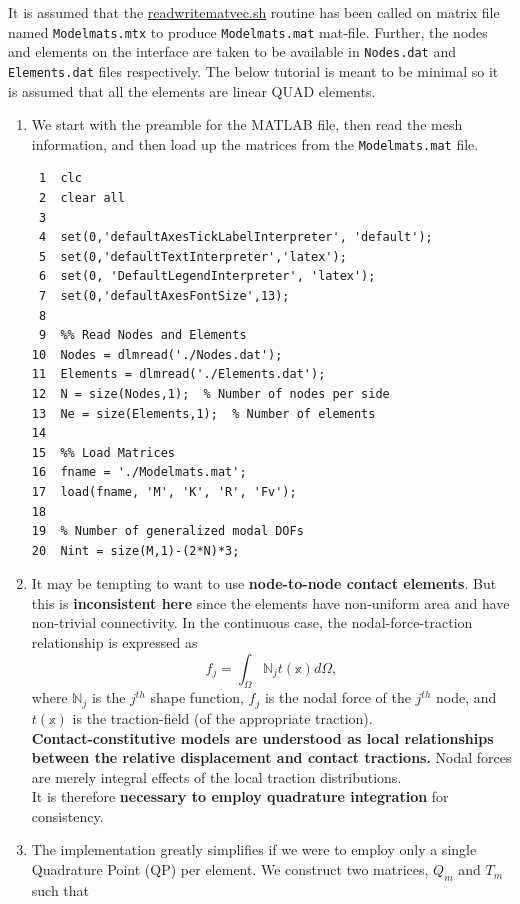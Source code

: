 \documentclass[11pt]{article}
\begin{document}
It is assumed that the \href{https://github.com/Nidish96/Abaqus4Joints/blob/main/scripts/readwritematvec.sh}{readwritematvec.sh} routine has been called on matrix file named \texttt{Modelmats.mtx} to produce \texttt{Modelmats.mat} mat-file.
Further, the nodes and elements on the interface are taken to be available in \texttt{Nodes.dat} and \texttt{Elements.dat} files respectively.
The below tutorial is meant to be minimal so it is assumed that all the elements are linear QUAD elements.
\begin{enumerate}
\item We start with the preamble for the MATLAB file, then read the mesh information, and then load up the matrices from the \texttt{Modelmats.mat} file.
\begin{verbatim}
 1  clc
 2  clear all
 3  
 4  set(0,'defaultAxesTickLabelInterpreter', 'default');
 5  set(0,'defaultTextInterpreter','latex');
 6  set(0, 'DefaultLegendInterpreter', 'latex');
 7  set(0,'defaultAxesFontSize',13);
 8  
 9  %% Read Nodes and Elements
10  Nodes = dlmread('./Nodes.dat');
11  Elements = dlmread('./Elements.dat');
12  N = size(Nodes,1);  % Number of nodes per side
13  Ne = size(Elements,1);  % Number of elements
14  
15  %% Load Matrices
16  fname = './Modelmats.mat';
17  load(fname, 'M', 'K', 'R', 'Fv');
18  
19  % Number of generalized modal DOFs
20  Nint = size(M,1)-(2*N)*3;
\end{verbatim}
\item It may be tempting to want to use \textbf{node-to-node contact elements}.
But this is \textbf{inconsistent here} since the elements have non-uniform area and have non-trivial connectivity.
In the continuous case, the nodal-force-traction relationship is expressed as
$$ f_j = \int_\Omega \mathbb{N}_j t(\mathbb{x}) d\Omega, $$
where \(\mathbb{N}_j\) is the \(j^{th}\) shape function, \(f_j\) is the nodal force of the \(j^{th}\) node, and \(t(\mathbb{x})\) is the traction-field (of the appropriate traction).\\[0pt]
\textbf{Contact-constitutive models are understood as local relationships between the relative displacement and contact tractions.}
Nodal forces are merely integral effects of the local traction distributions.\\[0pt]
It is therefore \textbf{necessary to employ quadrature integration} for consistency.
\item The implementation greatly simplifies if we were to employ only a single Quadrature Point (QP) per element.
We construct two matrices, \(Q_m\) and \(T_m\) such that

\end{enumerate}
\end{document}

